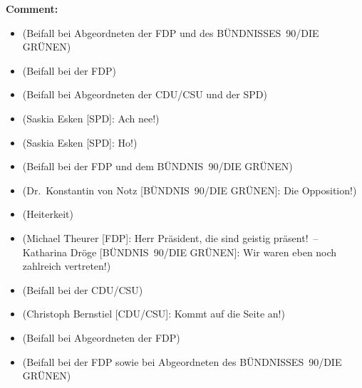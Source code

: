 \documentclass{article}
\begin{document}
\noindent\textbf{Comment:}
\begin{itemize}
    \setlength\itemsep{-3pt}
    \item (Beifall bei Abgeordneten der FDP und des BÜNDNISSES 90/DIE GRÜNEN)
    \setlength\itemsep{-3pt}
    \item (Beifall bei der FDP)
    \setlength\itemsep{-3pt}
    \item (Beifall bei Abgeordneten der CDU/CSU und der SPD)
    \setlength\itemsep{-3pt}
    \item (Saskia Esken [SPD]: Ach nee!)
    \setlength\itemsep{-3pt}
    \item (Saskia Esken [SPD]: Ho!)
    \setlength\itemsep{-3pt}
    \item (Beifall bei der FDP und dem BÜNDNIS 90/DIE GRÜNEN)
    \setlength\itemsep{-3pt}
    \item (Dr. Konstantin von Notz [BÜNDNIS 90/DIE GRÜNEN]: Die Opposition!)
    \setlength\itemsep{-3pt}
    \item (Heiterkeit)
    \setlength\itemsep{-3pt}
    \item (Michael Theurer [FDP]: Herr Präsident, die sind geistig präsent! – Katharina Dröge [BÜNDNIS 90/DIE GRÜNEN]: Wir waren eben noch zahlreich vertreten!)
    \setlength\itemsep{-3pt}
    \item (Beifall bei der CDU/CSU)
    \setlength\itemsep{-3pt}
    \item (Christoph Bernstiel [CDU/CSU]: Kommt auf die Seite an!)
    \setlength\itemsep{-3pt}
    \item (Beifall bei Abgeordneten der FDP)
    \setlength\itemsep{-3pt}
    \item (Beifall bei der FDP sowie bei Abgeordneten des BÜNDNISSES 90/DIE GRÜNEN)
\end{itemize}
\end{document}
